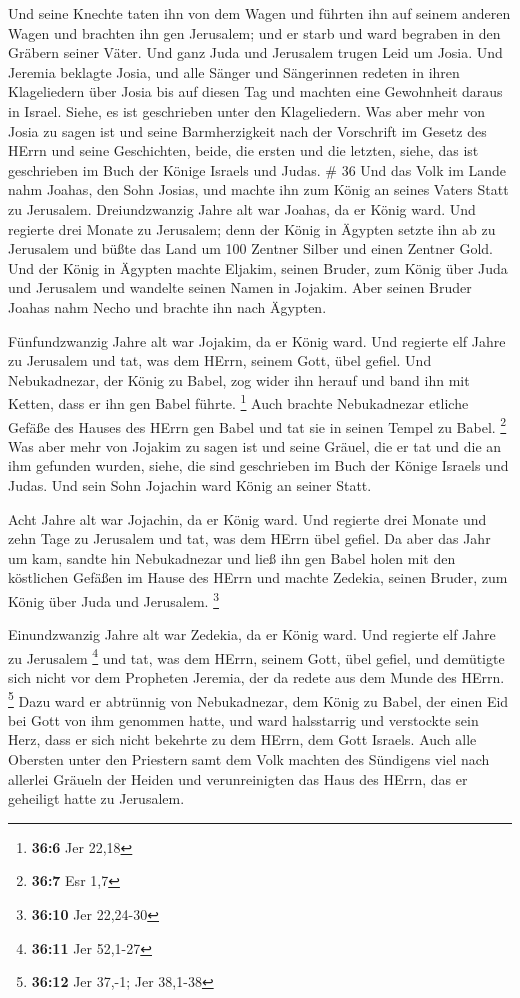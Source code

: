  Und seine Knechte taten ihn von dem Wagen und führten ihn
auf seinem anderen Wagen und brachten ihn gen Jerusalem; und er starb
und ward begraben in den Gräbern seiner Väter. Und ganz Juda und
Jerusalem trugen Leid um Josia.  Und Jeremia beklagte
Josia, und alle Sänger und Sängerinnen redeten in ihren Klageliedern
über Josia bis auf diesen Tag und machten eine Gewohnheit daraus in
Israel. Siehe, es ist geschrieben unter den Klageliedern. 
Was aber mehr von Josia zu sagen ist und seine Barmherzigkeit nach der
Vorschrift im Gesetz des HErrn  und seine Geschichten,
beide, die ersten und die letzten, siehe, das ist geschrieben im Buch
der Könige Israels und Judas. \# 36  Und das Volk im Lande
nahm Joahas, den Sohn Josias, und machte ihn zum König an seines Vaters
Statt zu Jerusalem.  Dreiundzwanzig Jahre alt war Joahas, da
er König ward. Und regierte drei Monate zu Jerusalem;  denn
der König in Ägypten setzte ihn ab zu Jerusalem und büßte das Land um
100 Zentner Silber und einen Zentner Gold.  Und der König in
Ägypten machte Eljakim, seinen Bruder, zum König über Juda und Jerusalem
und wandelte seinen Namen in Jojakim. Aber seinen Bruder Joahas nahm
Necho und brachte ihn nach Ägypten.

 Fünfundzwanzig Jahre alt war Jojakim, da er König ward. Und
regierte elf Jahre zu Jerusalem und tat, was dem HErrn, seinem Gott,
übel gefiel.  Und Nebukadnezar, der König zu Babel, zog
wider ihn herauf und band ihn mit Ketten, dass er ihn gen Babel führte.
\footnote{\textbf{36:6} Jer 22,18}  Auch brachte
Nebukadnezar etliche Gefäße des Hauses des HErrn gen Babel und tat sie
in seinen Tempel zu Babel. \footnote{\textbf{36:7} Esr 1,7} 
Was aber mehr von Jojakim zu sagen ist und seine Gräuel, die er tat und
die an ihm gefunden wurden, siehe, die sind geschrieben im Buch der
Könige Israels und Judas. Und sein Sohn Jojachin ward König an seiner
Statt.

 Acht Jahre alt war Jojachin, da er König ward. Und regierte
drei Monate und zehn Tage zu Jerusalem und tat, was dem HErrn übel
gefiel.  Da aber das Jahr um kam, sandte hin Nebukadnezar
und ließ ihn gen Babel holen mit den köstlichen Gefäßen im Hause des
HErrn und machte Zedekia, seinen Bruder, zum König über Juda und
Jerusalem. \footnote{\textbf{36:10} Jer 22,24-30}

 Einundzwanzig Jahre alt war Zedekia, da er König ward. Und
regierte elf Jahre zu Jerusalem \footnote{\textbf{36:11} Jer 52,1-27}
 und tat, was dem HErrn, seinem Gott, übel gefiel, und
demütigte sich nicht vor dem Propheten Jeremia, der da redete aus dem
Munde des HErrn. \footnote{\textbf{36:12} Jer 37,-1; Jer 38,1-38}
 Dazu ward er abtrünnig von Nebukadnezar, dem König zu
Babel, der einen Eid bei Gott von ihm genommen hatte, und ward
halsstarrig und verstockte sein Herz, dass er sich nicht bekehrte zu dem
HErrn, dem Gott Israels.  Auch alle Obersten unter den
Priestern samt dem Volk machten des Sündigens viel nach allerlei Gräueln
der Heiden und verunreinigten das Haus des HErrn, das er geheiligt hatte
zu Jerusalem.

